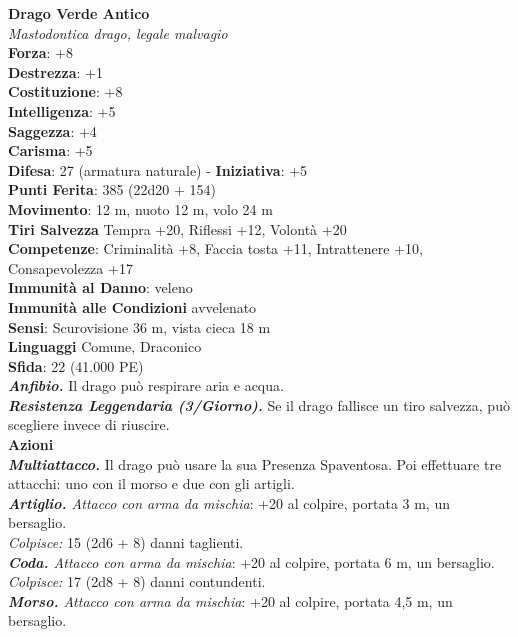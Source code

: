 \begin{multicols}{2}
\medskip\textbf{Drago Verde Antico}\\
\emph{Mastodontica drago, legale malvagio} \\
\textbf{Forza}: +8\\
\textbf{Destrezza}: +1\\
\textbf{Costituzione}: +8\\
\textbf{Intelligenza}: +5\\
\textbf{Saggezza}: +4\\
\textbf{Carisma}: +5\\
\textbf{Difesa}: 27 (armatura naturale) - \textbf{Iniziativa}: +5\\
\textbf{Punti Ferita}: 385 (22d20 + 154)\\
\textbf{Movimento}: 12 m, nuoto 12 m, volo 24 m\\
\textbf{Tiri Salvezza} Tempra +20, Riflessi +12, Volontà +20\\
\textbf{Competenze}: Criminalità +8, Faccia tosta +11, Intrattenere +10, Consapevolezza +17\\
\textbf{Immunità al Danno}: veleno\\
\textbf{Immunità alle Condizioni} avvelenato\\
\textbf{Sensi}: Scurovisione 36 m, vista cieca 18 m\\
\textbf{Linguaggi} Comune, Draconico\\
\textbf{Sfida}: 22 (41.000 PE)\smallskip\\
\emph{\textbf{Anfibio.}} Il drago può respirare aria e acqua.\\
\emph{\textbf{Resistenza Leggendaria (3/Giorno).}} Se il drago fallisce un tiro salvezza, può scegliere invece di riuscire.\\
\smallskip\textbf{Azioni}\\
\emph{\textbf{Multiattacco.}} Il drago può usare la sua Presenza Spaventosa. Poi effettuare tre attacchi: uno con il morso e due con gli artigli.\\
\emph{\textbf{Artiglio.} Attacco con arma da mischia}: +20 al colpire, portata 3 m, un bersaglio.\\
\emph{Colpisce:} 15 (2d6 + 8) danni taglienti.\\
\emph{\textbf{Coda.} Attacco con arma da mischia}: +20 al colpire, portata 6 m, un bersaglio.\\
\emph{Colpisce:} 17 (2d8 + 8) danni contundenti.\\
\emph{\textbf{Morso.} Attacco con arma da mischia}: +20 al colpire, portata 4,5 m, un bersaglio.\\

\end{multicols}
